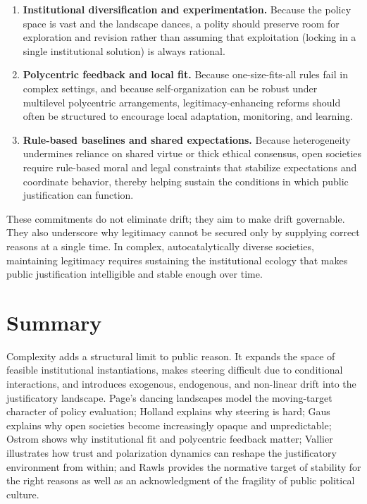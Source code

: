 \documentclass[12pt]{report}
\begin{document}
\begin{enumerate}[leftmargin=*, itemsep=0.5em]
  \item \textbf{Institutional diversification and experimentation.} Because the policy space is vast and the landscape dances, a polity should preserve room for exploration and revision rather than assuming that exploitation (locking in a single institutional solution) is always rational. \parencite[p.~123]{page2011diversity}
  \item \textbf{Polycentric feedback and local fit.} Because one-size-fits-all rules fail in complex settings, and because self-organization can be robust under multilevel polycentric arrangements, legitimacy-enhancing reforms should often be structured to encourage local adaptation, monitoring, and learning. \parencite[p.~642]{ostrom2010polycentric}
  \item \textbf{Rule-based baselines and shared expectations.} Because heterogeneity undermines reliance on shared virtue or thick ethical consensus, open societies require rule-based moral and legal constraints that stabilize expectations and coordinate behavior, thereby helping sustain the conditions in which public justification can function. \parencite[pp.~2--3]{gaus2016rulebased}
\end{enumerate}

These commitments do not eliminate drift; they aim to make drift governable. They also underscore why legitimacy cannot be secured only by supplying correct reasons at a single time. In complex, autocatalytically diverse societies, maintaining legitimacy requires sustaining the institutional ecology that makes public justification intelligible and stable enough over time.

\section{Summary}

Complexity adds a structural limit to public reason. It expands the space of feasible institutional instantiations, makes steering difficult due to conditional interactions, and introduces exogenous, endogenous, and non-linear drift into the justificatory landscape. Page’s dancing landscapes model the moving-target character of policy evaluation; Holland explains why steering is hard; Gaus explains why open societies become increasingly opaque and unpredictable; Ostrom shows why institutional fit and polycentric feedback matter; Vallier illustrates how trust and polarization dynamics can reshape the justificatory environment from within; and Rawls provides the normative target of stability for the right reasons as well as an acknowledgment of the fragility of public political culture. \parencite[pp.~14, 102]{gaus2021open} \parencite[pp.~94, 123, 162--163]{page2011diversity} \parencite[pp.~1--2]{holland2012signals} \parencite[pp.~1, 3]{vallier2020trust} \parencite[pp.~642--643]{ostrom2010polycentric} \parencite[pp.~453, 459, 485]{rawls2005political}
\end{document}
